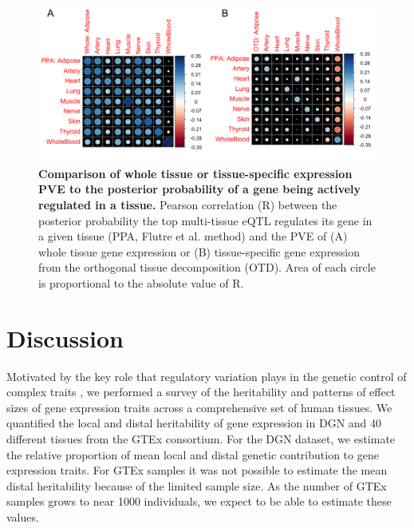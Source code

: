 \documentclass[10pt,letterpaper]{article}
\begin{document}
\begin{figure}[h]
\includegraphics[width=12cm]{Figures/Fig-cor-StephensPr-v-PVE.png}
\caption{{\bf Comparison of whole tissue or tissue-specific expression PVE to the posterior 
probability of a gene being actively regulated in a tissue.} 
Pearson correlation (R) between the posterior probability the top multi-tissue eQTL 
regulates its gene in a given tissue (PPA, Flutre et al. method) and the PVE of (A) whole 
tissue gene expression or (B) tissue-specific gene expression from the orthogonal
tissue decomposition (OTD). Area of each circle is proportional to the absolute value of R.}
\label{fig-corrplot}
\end{figure}



\section*{Discussion}
Motivated by the key role that regulatory variation plays in the genetic control of complex traits \cite{Nicolae_2010,Nica_2010,Gusev_2014}, we performed a survey of the heritability and patterns of effect sizes of gene expression traits across a comprehensive set of human tissues. We quantified the local and distal heritability of gene expression in DGN and 40 different tissues from the GTEx consortium. For the DGN dataset, we estimate the relative proportion of mean local and distal genetic contribution to gene expression traits. For GTEx samples it was not possible to estimate the mean distal heritability because of the limited sample size. As the number of GTEx samples grows to near 1000 individuals, we expect to be able to estimate these values.
\end{document}
